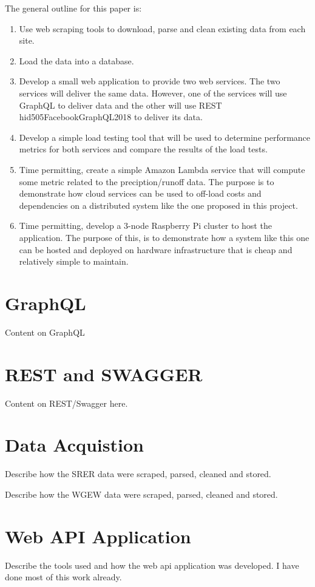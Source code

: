 The general outline for this paper is:

\begin{enumerate}
\item Use web scraping tools to download, parse and clean existing data from 
each site.  
\item Load the data into a database.  
\item Develop a small web application to provide two web services.  The two 
services will deliver the same data.  However, one of the services will use 
GraphQL to deliver data and the other will use REST\cite{hid505swaggerio2018} hid505FacebookGraphQL2018
to deliver its data. 
\item Develop a simple load testing tool that will be used to determine 
performance metrics for both services and compare the results of the load tests.
\item Time permitting, create a simple Amazon Lambda service that will compute 
some metric related to the preciption/runoff data.  The purpose is to 
demonstrate how cloud services can be used to off-load costs and dependencies 
on a distributed system like the one proposed in this project.
\item Time permitting, develop a 3-node Raspberry Pi cluster to host the 
application.  The purpose of this, is to demonstrate how a system like this 
one can be hosted and deployed on hardware infrastructure that is cheap and 
relatively simple to maintain.
\end{enumerate}

\section{GraphQL}
Content on GraphQL

\section{REST and SWAGGER}
Content on REST/Swagger here.

\section{Data Acquistion}
Describe how the SRER data were scraped, parsed, cleaned and stored.

Describe how the WGEW data were scraped, parsed, cleaned and stored.

\section{Web API Application}
Describe the tools used and how the web api application was developed.
I have done most of this work already.

